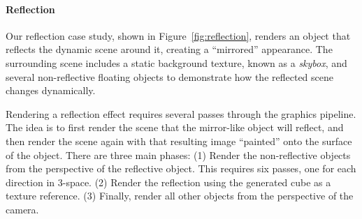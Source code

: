 {\paragraph{Reflection}

Our reflection case study, shown in Figure~\ref{fig:reflection}, renders an object that reflects the dynamic scene around it, creating a ``mirrored'' appearance.
The surrounding scene includes a static background texture, known as a \emph{skybox}, and several non-reflective floating objects to demonstrate how the reflected scene changes dynamically.

Rendering a reflection effect requires several passes through the graphics pipeline.
The idea is to first render the scene that the mirror-like object will reflect, and then render the scene again with that resulting image ``painted'' onto the surface of the object.
There are three main phases:
(1) Render the non-reflective objects from the perspective of the reflective object.
This requires six passes, one for each direction in 3-space.
(2) Render the reflection using the generated cube as a texture reference.
(3) Finally, render all other objects from the perspective of the camera.

}
